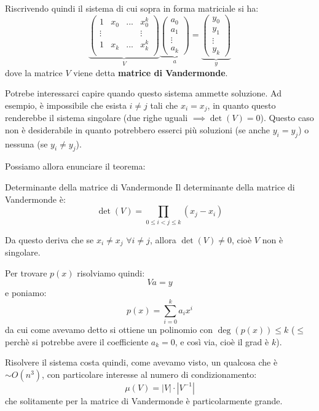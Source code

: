 \documentclass[a4paper,11pt]{article}
\begin{document}
Riscrivendo quindi il sistema di cui sopra in forma matriciale si ha:
$$
\underbrace{
\begin{pmatrix}
	1 & x_0 & ... & x_0^k \\
	\vdots  & & & \vdots\\
	1 & x_k & ... & x_k^k \\
\end{pmatrix}
}_V
\underbrace{
\begin{pmatrix}
	a_0 \\ a_1 \\ \vdots \\ a_k
\end{pmatrix}
}_a
=
\underbrace{
\begin{pmatrix}
	y_0 \\ y_1 \\ \vdots \\ y_k 
\end{pmatrix}
}_y
$$
dove la matrice $V$ viene detta \textbf{matrice di Vandermonde}.

Potrebe interessarci capire quando questo sistema ammette soluzione.
Ad esempio, è impossibile che esista $i \neq j$ tali che $x_i = x_j$, in quanto questo renderebbe il sistema singolare (due righe uguali $\implies \det(V) = 0$).
Questo caso non è desiderabile in quanto potrebbero esserci più soluzioni (se anche $y_i = y_j$) o nessuna (se $y_i \neq y_j$).

Possiamo allora enunciare il teorema:
\begin{theorem}{Determinante della matrice di Vandermonde}
	Il determinante della matrice di Vandermonde è:
	$$
	\det(V) = \prod_{0 \leq i < j \leq k} (x_j - x_i)
	$$
\end{theorem}

Da questo deriva che se $x_i \neq x_j$ $\forall i \neq j$, allora $\det(V) \neq 0$, cioè $V$ non è singolare.

Per trovare $p(x)$ risolviamo quindi:
$$
Va = y
$$
e poniamo:
$$
p(x) = \sum_{i = 0}^k a_i x^i
$$
da cui come avevamo detto si ottiene un polinomio con $\deg(p(x)) \leq k$ ($\leq$ perchè si potrebbe avere il coefficiente $a_k = 0$, e così via, cioè il grad è  $k$).

Risolvere il sistema costa quindi, come avevamo visto, un qualcosa che è $\sim O(n^3)$, con particolare interesse al numero di condizionamento:
$$
\mu(V) = |V| \cdot |V^{-1}|
$$
che solitamente per la matrice di Vandermonde è particolarmente grande.

\par\smallskip
\end{document}
